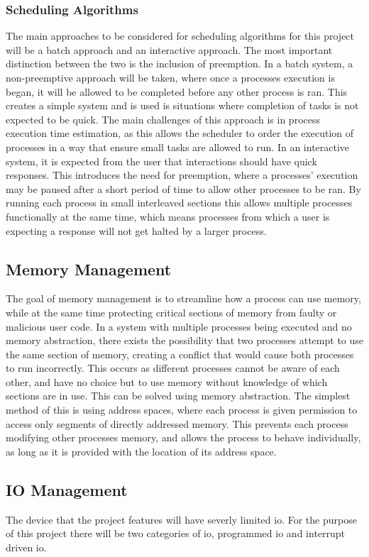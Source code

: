 \subsubsection{Scheduling Algorithms}
The main approaches to be considered for scheduling algorithms for this project will be a batch approach and an interactive approach. The most important distinction between the two is the inclusion of preemption. In a batch system, a non-preemptive approach will be taken, where once a processes execution is began, it will be allowed to be completed before any other process is ran. This creates a simple system and is used is situations where completion of tasks is not expected to be quick. The main challenges of this approach is in process execution time estimation, as this allows the scheduler to order the execution of processes in a way that ensure small tasks are allowed to run. In an interactive system, it is expected from the user that interactions should have quick responses. This introduces the need for preemption, where a processes' execution may be paused after a short period of time to allow other processes to be ran. By running each process in small interleaved sections this allows multiple processes functionally at the same time, which means processes from which a user is expecting a response will not get halted by a larger process.\cite{modern_operating}
\subsection{Memory Management}
The goal of memory management is to streamline how a process can use memory, while at the same time protecting critical sections of memory from faulty or malicious user code. In a system with multiple processes being executed and no memory abstraction, there exists the possibility that two processes attempt to use the same section of memory, creating a conflict that would cause both processes to run incorrectly. This occurs as different processes cannot be aware of each other, and have no choice but to use memory without knowledge of which sections are in use. This can be solved using memory abstraction. The simplest method of this is using address spaces, where each process is given permission to access only segments of directly addressed memory. This prevents each process modifying other processes memory, and allows the process to behave individually, as long as it is provided with the location of its address space.\cite{modern_operating}
\subsection{IO Management}
The device that the project features will have severly limited \ac{io}. For the purpose of this project there will be two categories of \ac{io}, programmed \ac{io} and interrupt driven \ac{io}. 
